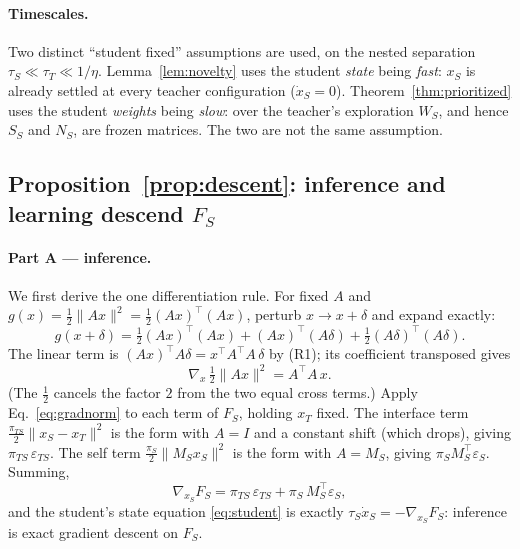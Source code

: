 \documentclass[10pt,letterpaper]{article}
\theoremstyle{plain}
\theoremstyle{remark}
\newcommand{\eps}{\varepsilon}
\newcommand{\xT}{x_T}
\newcommand{\xS}{x_S}
\newcommand{\WS}{W_S}
\newcommand{\MS}{M_S}
\renewcommand{\SS}{S_S}
\newcommand{\NS}{N_S}
\newcommand{\FS}{F_S}
\newcommand{\epsS}{\eps_S}
\newcommand{\epsTS}{\eps_{TS}}
\newcommand{\piS}{\pi_S}
\newcommand{\piTS}{\pi_{TS}}
\newcommand{\tauT}{\tau_T}
\newcommand{\tauS}{\tau_S}
\newcommand{\tr}{^{\!\top}}
\begin{document}
\paragraph{Timescales.} Two distinct ``student fixed'' assumptions are used, on the nested separation
$\tauS\ll\tauT\ll1/\eta$. Lemma~\ref{lem:novelty} uses the student \emph{state} being \emph{fast}: $\xS$
is already settled at every teacher configuration ($\dot\xS=0$). Theorem~\ref{thm:prioritized} uses the
student \emph{weights} being \emph{slow}: over the teacher's exploration $\WS$, and hence $\SS$ and
$\NS$, are frozen matrices. The two are not the same assumption.

\subsection{Proposition~\ref{prop:descent}: inference and learning descend \texorpdfstring{$\FS$}{FS}}
\label{app:prop1}

\paragraph{Part A --- inference.} We first derive the one differentiation rule. For fixed $A$ and
$g(x)=\tfrac12\|Ax\|^2=\tfrac12(Ax)\tr(Ax)$, perturb $x\to x+\delta$ and expand exactly:
\[
g(x+\delta)=\tfrac12(Ax)\tr(Ax)+(Ax)\tr(A\delta)+\tfrac12(A\delta)\tr(A\delta).
\]
The linear term is $(Ax)\tr A\delta=x\tr A\tr A\,\delta$ by (R1); its coefficient transposed gives
\begin{equation}
\label{eq:gradnorm}
\nabla_x\,\tfrac12\|Ax\|^2=A\tr A\,x.
\end{equation}
(The $\tfrac12$ cancels the factor $2$ from the two equal cross terms.) Apply
Eq.~\eqref{eq:gradnorm} to each term of $\FS$, holding $\xT$ fixed. The interface term
$\tfrac{\piTS}{2}\|\xS-\xT\|^2$ is the form with $A=I$ and a constant shift (which drops), giving
$\piTS\,\epsTS$. The self term $\tfrac{\piS}{2}\|\MS\xS\|^2$ is the form with $A=\MS$, giving
$\piS\MS\tr\epsS$. Summing,
\[
\nabla_{\xS}\FS=\piTS\,\epsTS+\piS\,\MS\tr\epsS,
\]
and the student's state equation \eqref{eq:student} is exactly $\tauS\dot\xS=-\nabla_{\xS}\FS$: inference
is exact gradient descent on $\FS$.
\end{document}
